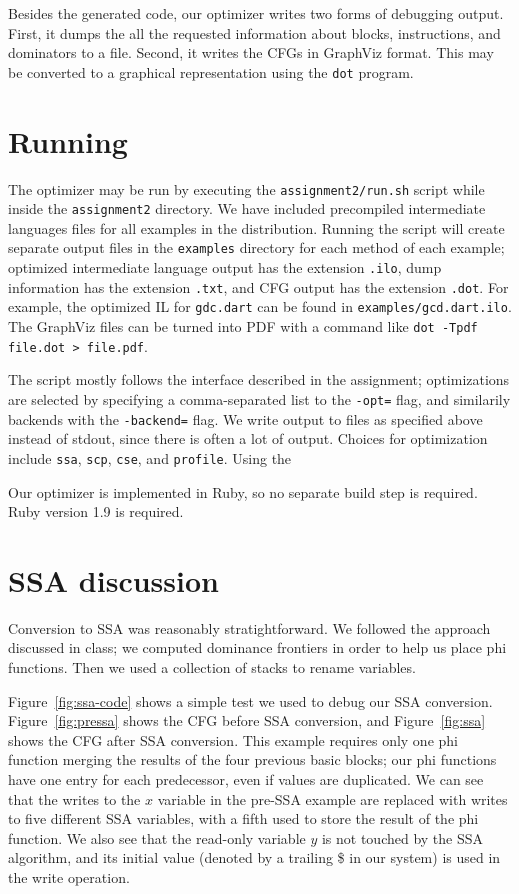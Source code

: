 \documentclass[10pt,twocolumn]{article}
\begin{document}
Besides the generated code, our optimizer writes two forms of
debugging output. First, it dumps the all the requested information
about blocks, instructions, and dominators to a file. Second, it
writes the CFGs in GraphViz format. This may be converted to a
graphical representation using the \texttt{dot} program.

\section{Running}

The optimizer may be run by executing the \texttt{assignment2/run.sh}
script while inside the \texttt{assignment2} directory. We have
included precompiled intermediate languages files for all examples in
the distribution. Running the script will create separate output files
in the \texttt{examples} directory for each method of each example;
optimized intermediate language output has the extension
\texttt{.ilo}, dump information has the extension \texttt{.txt}, and
CFG output has the extension \texttt{.dot}. For example, the optimized
IL for \texttt{gdc.dart} can be found in
\texttt{examples/gcd.dart.ilo}. The GraphViz files can be turned into
PDF with a command like \texttt{dot -Tpdf file.dot > file.pdf}.

The script mostly follows the interface described in the assignment;
optimizations are selected by specifying a comma-separated list to the
\texttt{-opt=} flag, and similarily backends with the
\texttt{-backend=} flag. We write output to files as specified above
instead of stdout, since there is often a lot of output. Choices for
optimization include \texttt{ssa}, \texttt{scp}, \texttt{cse}, and
\texttt{profile}. Using the

Our optimizer is implemented in Ruby, so no separate build step is
required. Ruby version 1.9 is required. 

\section{SSA discussion}

Conversion to SSA was reasonably stratightforward. We followed the
approach discussed in class; we computed dominance frontiers in order
to help us place phi functions. Then we used a collection of stacks to
rename variables.

Figure~\ref{fig:ssa-code} shows a simple test we used to debug our SSA
conversion. Figure~\ref{fig:pressa} shows the CFG before SSA
conversion, and Figure~\ref{fig:ssa} shows the CFG after SSA
conversion. This example requires only one phi function merging the
results of the four previous basic blocks; our phi functions have one
entry for each predecessor, even if values are duplicated. We can see
that the writes to the $x$ variable in the pre-SSA example are
replaced with writes to five different SSA variables, with a fifth
used to store the result of the phi function. We also see that the
read-only variable $y$ is not touched by the SSA algorithm, and its
initial value (denoted by a trailing \$ in our system) is used in the
write operation.
\end{document}
